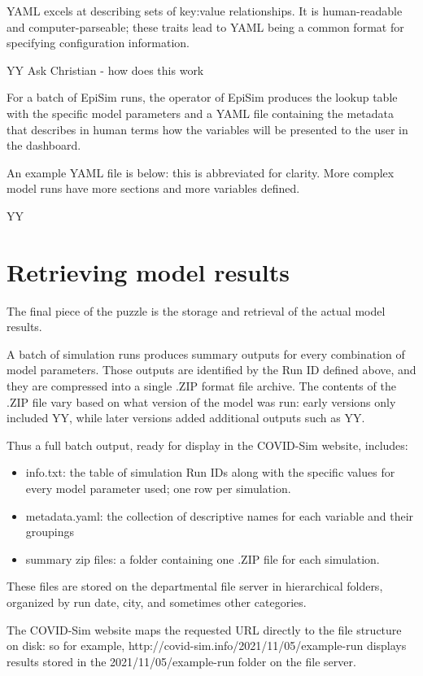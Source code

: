 YAML excels at describing sets of key:value relationships. It is human-readable and computer-parseable; these traits lead to YAML being a common format for specifying configuration information.

YY Ask Christian - how does this work

For a batch of EpiSim runs, the operator of EpiSim produces the lookup table with the specific model parameters and a YAML file containing the metadata that describes in human terms how the variables will be presented to the user in the dashboard.

An example YAML file is below: this is abbreviated for clarity. More complex model runs have more sections and more variables defined.

YY

\hypertarget{retrieving-model-results}{%
\section{Retrieving model results}\label{retrieving-model-results}}

The final piece of the puzzle is the storage and retrieval of the actual model results.

A batch of simulation runs produces summary outputs for every combination of model parameters. Those outputs are identified by the Run ID defined above, and they are compressed into a single .ZIP format file archive. The contents of the .ZIP file vary based on what version of the model was run: early versions only included YY, while later versions added additional outputs such as YY.

Thus a full batch output, ready for display in the COVID-Sim website,
includes:

\begin{itemize}
\item
  info.txt: the table of simulation Run IDs along with the specific
  values for every model parameter used; one row per simulation.
\item
  metadata.yaml: the collection of descriptive names for each variable
  and their groupings
\item
  summary zip files: a folder containing one .ZIP file for each
  simulation.
\end{itemize}

These files are stored on the departmental file server in hierarchical folders, organized by run date, city, and sometimes other categories.

The COVID-Sim website maps the requested URL directly to the file structure on disk: so for example, http://covid-sim.info/2021/11/05/example-run displays results stored in the 2021/11/05/example-run folder on the file server.


